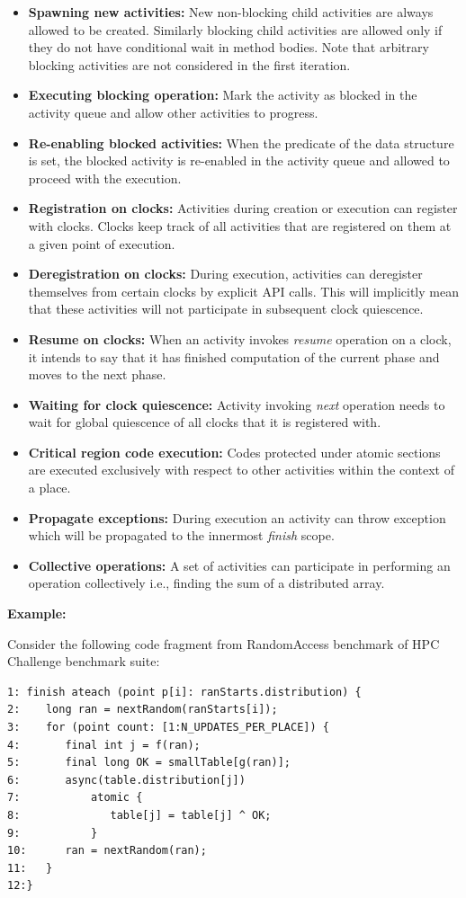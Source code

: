 \begin{itemize}
\item {\bf Spawning new activities:} New non-blocking child activities
are always allowed to be created. Similarly blocking child
activities are allowed only if they do not have conditional wait in
method bodies. Note that arbitrary blocking activities are not
considered in the first iteration.
\item {\bf Executing blocking operation:} Mark the activity as
blocked in the activity queue  and allow other activities to progress.
\item {\bf Re-enabling blocked activities:} When the predicate of the
data structure is set, the blocked activity is re-enabled in the
activity queue and allowed to proceed with the execution.
\item {\bf Registration on clocks:} Activities during creation or
execution can register with clocks. Clocks keep track
of all activities that are registered on them at a given point of
execution.
\item {\bf Deregistration on clocks:} During execution, activities can
deregister themselves from certain clocks by explicit API calls. This will
implicitly mean that these activities will not participate in
subsequent clock quiescence. 
\item {\bf Resume on clocks:} When an activity invokes {\it resume}
operation on a clock, it intends to say that it has finished
computation of the current phase and moves to the next phase. 
\item {\bf Waiting for clock quiescence:} Activity invoking {\it
next} operation needs to wait for  global quiescence of all clocks
that it is registered with.
\item {\bf Critical region code execution:} Codes protected under
atomic sections are executed exclusively with respect to other
activities within the context of a \Xten{} place. 
\item {\bf Propagate exceptions:} During execution an activity can
throw exception which will be propagated to the innermost {\it finish}
scope.
\item {\bf Collective operations:} A set of activities can participate
in performing an operation collectively i.e., finding the sum of a
distributed \Xten{} array.
\end{itemize}


{\bf Example:}\label{sec:deploy:example}


Consider the following code fragment from RandomAccess benchmark
of HPC Challenge benchmark suite:
\begin{verbatim}
1: finish ateach (point p[i]: ranStarts.distribution) {
2:    long ran = nextRandom(ranStarts[i]);
3:    for (point count: [1:N_UPDATES_PER_PLACE]) {
4:       final int j = f(ran);
5:       final long OK = smallTable[g(ran)];
6:       async(table.distribution[j]) 
7:           atomic {
8:              table[j] = table[j] ^ OK;
9:           } 
10:      ran = nextRandom(ran);
11:   }
12:}	 
\end{verbatim}


